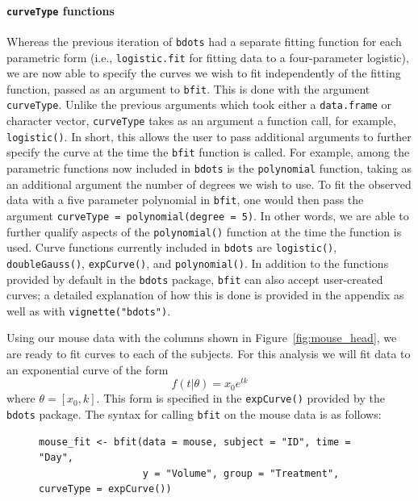 \documentclass{article}
\newcommand{\xt}{\texttt}%
\begin{document}
\paragraph{\xt{curveType} functions} Whereas the previous iteration of \xt{bdots} had a separate fitting function for each parametric form (i.e., \xt{logistic.fit} for fitting data to a four-parameter logistic), we are now able to specify the curves we wish to fit independently of the fitting function, passed as an argument to \xt{bfit}. This is done with the argument \xt{curveType}. Unlike the previous arguments which took either a \xt{data.frame} or character  vector, \xt{curveType} takes as an argument a function call, for example, \xt{logistic()}. In short, this allows the user to pass additional arguments to further specify the curve at the time the \xt{bfit} function is called. For example, among the parametric functions now included in \xt{bdots} is the \xt{polynomial} function, taking as an additional argument the number of degrees we wish to use. To fit the observed data with a five parameter polynomial in \xt{bfit}, one would then pass the argument \xt{curveType = polynomial(degree = 5)}. In other words, we are able to further qualify aspects of the \xt{polynomial()} function at the time the function is used. Curve functions currently included in \xt{bdots} are \xt{logistic()}, \xt{doubleGauss()}, \xt{expCurve()}, and \xt{polynomial()}. In addition to the functions provided by default in the \xt{bdots} package, \xt{bfit} can also accept user-created curves; a detailed explanation of how this is done is provided in the appendix as well as with \xt{vignette("bdots")}.

Using our mouse data with the columns shown in Figure~\ref{fig:mouse_head}, we are ready to fit curves to each of the subjects. For this analysis we will fit data to an exponential curve of the form
\begin{equation}
f(t|\theta) = x_0 e^{tk}
\end{equation}
where $\theta = [x_0, k]$. This form is specified in the \xt{expCurve()} provided by the \xt{bdots} package. The syntax for calling \xt{bfit} on the mouse data is as follows:


\begin{singlespace}
\begin{figure}[H]
\centering
\begin{BVerbatim}
mouse_fit <- bfit(data = mouse, subject = "ID", time = "Day", 
                  y = "Volume", group = "Treatment", curveType = expCurve())
\end{BVerbatim}
\label{fig:bfit_example}
\end{figure}
\end{singlespace}
\end{document}
